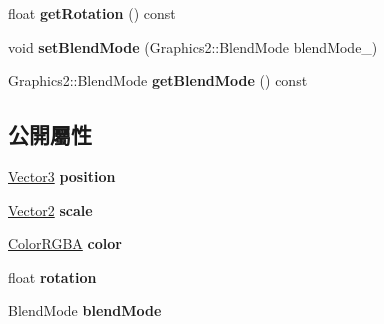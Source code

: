 \begin{DoxyCompactItemize}
\item 
float {\bfseries get\+Rotation} () const \hypertarget{classi_dream_sky_1_1_graphics2_a4d2b915a74bbbe16d791742e5f7bdb4f}{}\label{classi_dream_sky_1_1_graphics2_a4d2b915a74bbbe16d791742e5f7bdb4f}

\item 
void {\bfseries set\+Blend\+Mode} (Graphics2\+::\+Blend\+Mode blend\+Mode\+\_\+)\hypertarget{classi_dream_sky_1_1_graphics2_a99d881e73fe1ceb309e0db152e884cb6}{}\label{classi_dream_sky_1_1_graphics2_a99d881e73fe1ceb309e0db152e884cb6}

\item 
Graphics2\+::\+Blend\+Mode {\bfseries get\+Blend\+Mode} () const \hypertarget{classi_dream_sky_1_1_graphics2_ae18b7ea97894b285c105455cc5e74a65}{}\label{classi_dream_sky_1_1_graphics2_ae18b7ea97894b285c105455cc5e74a65}

\end{DoxyCompactItemize}
\subsection*{公開屬性}
\begin{DoxyCompactItemize}
\item 
\hyperlink{class_i_dream_sky_1_1_vector3}{Vector3} {\bfseries position}\hypertarget{classi_dream_sky_1_1_graphics2_ae56df505974899b15f6a86033cc1b24b}{}\label{classi_dream_sky_1_1_graphics2_ae56df505974899b15f6a86033cc1b24b}

\item 
\hyperlink{class_i_dream_sky_1_1_vector2}{Vector2} {\bfseries scale}\hypertarget{classi_dream_sky_1_1_graphics2_a850502ca98312bc8b9c6ebe08e7e190d}{}\label{classi_dream_sky_1_1_graphics2_a850502ca98312bc8b9c6ebe08e7e190d}

\item 
\hyperlink{class_i_dream_sky_1_1_color_r_g_b_a}{Color\+R\+G\+BA} {\bfseries color}\hypertarget{classi_dream_sky_1_1_graphics2_a1743a8c2a17f79e68cdb8bcabe7f297a}{}\label{classi_dream_sky_1_1_graphics2_a1743a8c2a17f79e68cdb8bcabe7f297a}

\item 
float {\bfseries rotation}\hypertarget{classi_dream_sky_1_1_graphics2_af144d3272aaa0fabb9947d6f68eb7052}{}\label{classi_dream_sky_1_1_graphics2_af144d3272aaa0fabb9947d6f68eb7052}

\item 
Blend\+Mode {\bfseries blend\+Mode}\hypertarget{classi_dream_sky_1_1_graphics2_a8db30c670e9be626bd2f4aed583813ba}{}\label{classi_dream_sky_1_1_graphics2_a8db30c670e9be626bd2f4aed583813ba}

\end{DoxyCompactItemize}
